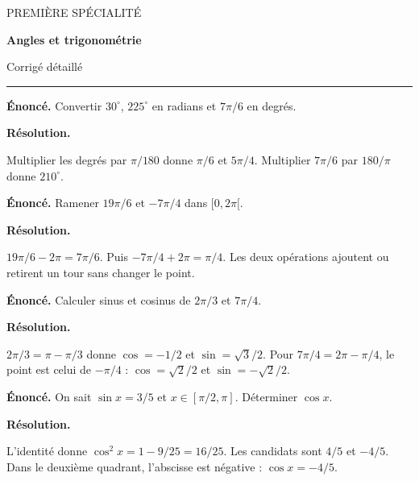 \documentclass[11pt,a4paper]{article}
\begin{document}
{\small\color{Blue}PREMIÈRE SPÉCIALITÉ}\par{\LARGE\bfseries Angles et trigonométrie}\par{\large Corrigé détaillé}\par\vspace{0.2cm}\hrule\vspace{0.4cm}
\par\noindent\begin{minipage}{\linewidth}
{\small\color{Muted}\textbf{Énoncé.} Convertir $30^\circ$, $225^\circ$ en radians et $7\pi/6$ en degrés.}
\par\medskip
\textbf{Résolution.}\par
Multiplier les degrés par $\pi/180$ donne $\pi/6$ et $5\pi/4$. Multiplier $7\pi/6$ par $180/\pi$ donne $210^\circ$.
\end{minipage}\par
\par\noindent\begin{minipage}{\linewidth}
{\small\color{Muted}\textbf{Énoncé.} Ramener $19\pi/6$ et $-7\pi/4$ dans $[0,2\pi[$.}
\par\medskip
\textbf{Résolution.}\par
$19\pi/6-2\pi=7\pi/6$. Puis $-7\pi/4+2\pi=\pi/4$. Les deux opérations ajoutent ou retirent un tour sans changer le point.
\end{minipage}\par
\par\noindent\begin{minipage}{\linewidth}
{\small\color{Muted}\textbf{Énoncé.} Calculer sinus et cosinus de $2\pi/3$ et $7\pi/4$.}
\par\medskip
\textbf{Résolution.}\par
$2\pi/3=\pi-\pi/3$ donne $\cos=-1/2$ et $\sin=\sqrt3/2$. Pour $7\pi/4=2\pi-\pi/4$, le point est celui de $-\pi/4$ : $\cos=\sqrt2/2$ et $\sin=-\sqrt2/2$.
\end{minipage}\par
\par\noindent\begin{minipage}{\linewidth}
{\small\color{Muted}\textbf{Énoncé.} On sait $\sin x=3/5$ et $x\in[\pi/2,\pi]$. Déterminer $\cos x$.}
\par\medskip
\textbf{Résolution.}\par
L’identité donne $\cos^2x=1-9/25=16/25$. Les candidats sont $4/5$ et $-4/5$. Dans le deuxième quadrant, l’abscisse est négative : $\cos x=-4/5$.
\end{minipage}\par
\end{document}
